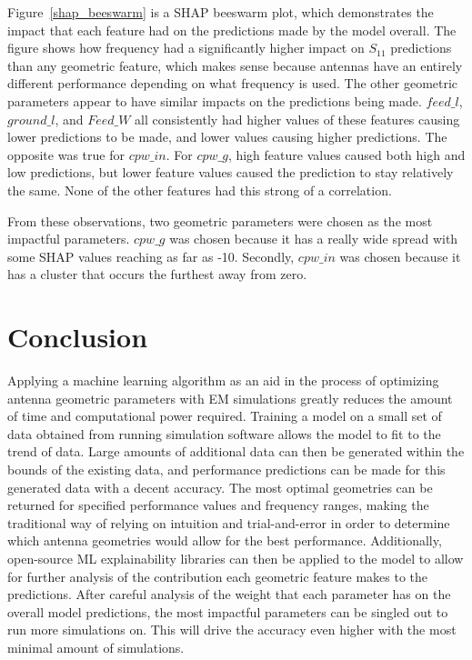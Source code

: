 \documentclass[conference]{IEEEtran}
\begin{document}
Figure~\ref{shap_beeswarm} is a SHAP beeswarm plot, which demonstrates the impact that each feature had on the predictions made by the model overall. The figure shows how frequency had a significantly higher impact on $S_{11}$ predictions than any geometric feature, which makes sense because antennas have an entirely different performance depending on what frequency is used. The other geometric parameters appear to have similar impacts on the predictions being made. $feed\_l$, $ground\_l$, and $Feed\_W$ all consistently had higher values of these features causing lower predictions to be made, and lower values causing higher predictions. The opposite was true for $cpw\_in$. For $cpw\_g$, high feature values caused both high and low predictions, but lower feature values caused the prediction to stay relatively the same. None of the other features had this strong of a correlation. 

From these observations, two geometric parameters were chosen as the most impactful parameters. $cpw\_g$ was chosen because it has a really wide spread with some SHAP values reaching as far as -10. Secondly, $cpw\_in$ was chosen because it has a cluster that occurs the furthest away from zero.


\section{Conclusion}
Applying a machine learning algorithm as an aid in the process of optimizing antenna geometric parameters with EM simulations greatly reduces the amount of time and computational power required. Training a model on a small set of data obtained from running simulation software allows the model to fit to the trend of data. Large amounts of additional data can then be generated within the bounds of the existing data, and performance predictions can be made for this generated data with a decent accuracy. The most optimal geometries can be returned for specified performance values and frequency ranges, making the traditional way of relying on intuition and trial-and-error in order to determine which antenna geometries would allow for the best performance. Additionally, open-source ML explainability libraries can then be applied to the model to allow for further analysis of the contribution each geometric feature makes to the predictions. After careful analysis of the weight that each parameter has on the overall model predictions, the most impactful parameters can be singled out to run more simulations on. This will drive the accuracy even higher with the most minimal amount of simulations. 





\vfill
\end{document}
